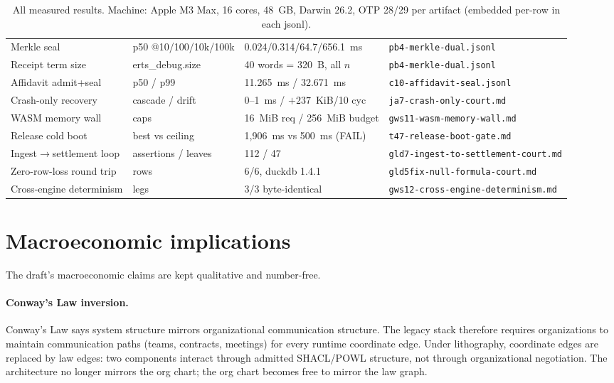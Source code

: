 \documentclass[11pt,a4paper]{article}
\begin{document}
\begin{table}[htbp]
{\begin{tabular}{@{}llll@{}}
Merkle seal & p50 @10/100/10k/100k & 0.024/0.314/64.7/656.1~ms & \texttt{pb4-merkle-dual.jsonl} \\
Receipt term size & erts\_debug.size & 40 words = 320~B, all $n$ & \texttt{pb4-merkle-dual.jsonl} \\
Affidavit admit+seal & p50 / p99 & 11.265~ms / 32.671~ms & \texttt{c10-affidavit-seal.jsonl} \\
Crash-only recovery & cascade / drift & 0--1~ms / $+237$~KiB/10 cyc & \texttt{ja7-crash-only-court.md} \\
WASM memory wall & caps & 16~MiB req / 256~MiB budget & \texttt{gws11-wasm-memory-wall.md} \\
Release cold boot & best vs ceiling & 1{,}906~ms vs 500~ms (FAIL) & \texttt{t47-release-boot-gate.md} \\
Ingest$\to$settlement loop & assertions / leaves & 112 / 47 & \texttt{gld7-ingest-to-settlement-court.md} \\
Zero-row-loss round trip & rows & 6/6, duckdb 1.4.1 & \texttt{gld5fix-null-formula-court.md} \\
Cross-engine determinism & legs & 3/3 byte-identical & \texttt{gws12-cross-engine-determinism.md} \\
\bottomrule
\end{tabular}}
\caption{All measured results. Machine: Apple M3 Max, 16 cores, 48~GB, Darwin 26.2,
OTP 28/29 per artifact (embedded per-row in each jsonl).}
\label{tab:results}
\end{table}

\section{Macroeconomic implications}

The draft's macroeconomic claims are kept qualitative and number-free.

\paragraph{Conway's Law inversion.} Conway's Law says system structure mirrors
organizational communication structure. The legacy stack therefore requires organizations to
maintain communication paths (teams, contracts, meetings) for every runtime coordinate edge.
Under lithography, coordinate edges are replaced by law edges: two components interact
through admitted SHACL/POWL structure, not through organizational negotiation. The
architecture no longer mirrors the org chart; the org chart becomes free to mirror the law
graph.
\end{document}

